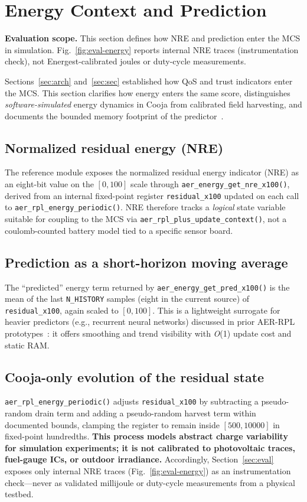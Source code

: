 \section{Energy Context and Prediction}
\label{sec:energy}

\noindent\textbf{Evaluation scope.} This section defines how NRE and prediction enter the MCS in simulation. Fig.~\ref{fig:eval-energy} reports internal NRE traces (instrumentation check), not Energest-calibrated joules or duty-cycle measurements.

Sections~\ref{sec:arch} and~\ref{sec:sec} established how QoS and trust indicators enter the MCS. This section clarifies how energy enters the same score, distinguishes \emph{software-simulated} energy dynamics in Cooja from calibrated field harvesting, and documents the bounded memory footprint of the predictor~\cite{osterlind2006cooja,oikonomou2022contik}.

\subsection{Normalized residual energy (NRE)}
The reference module exposes the normalized residual energy indicator (NRE) as an eight-bit value on the $[0,100]$ scale through \texttt{aer\_energy\_get\_nre\_x100()}, derived from an internal fixed-point register \texttt{residual\_x100} updated on each call to \texttt{aer\_rpl\_energy\_periodic()}. NRE therefore tracks a \emph{logical} state variable suitable for coupling to the MCS via \texttt{aer\_rpl\_plus\_update\_context()}, not a coulomb-counted battery model tied to a specific sensor board.

\subsection{Prediction as a short-horizon moving average}
The ``predicted'' energy term returned by \texttt{aer\_energy\_get\_pred\_x100()} is the mean of the last \texttt{N\_HISTORY} samples (eight in the current source) of \texttt{residual\_x100}, again scaled to $[0,100]$. This is a lightweight surrogate for heavier predictors (e.g., recurrent neural networks) discussed in prior AER-RPL prototypes~\cite{belacel2025aerrpl}: it offers smoothing and trend visibility with \emph{O}(1) update cost and static RAM.

\subsection{Cooja-only evolution of the residual state}
\texttt{aer\_rpl\_energy\_periodic()} adjusts \texttt{residual\_x100} by subtracting a pseudo-random drain term and adding a pseudo-random harvest term within documented bounds, clamping the register to remain inside $[500,10000]$ in fixed-point hundredths. \textbf{This process models abstract charge variability for simulation experiments; it is not calibrated to photovoltaic traces, fuel-gauge ICs, or outdoor irradiance.} Accordingly, Section~\ref{sec:eval} exposes only internal NRE traces (Fig.~\ref{fig:eval-energy}) as an instrumentation check---never as validated millijoule or duty-cycle measurements from a physical testbed.

